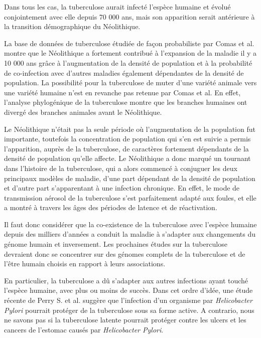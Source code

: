 \documentclass[twoside,a4paper,11pt,frenchb,openany]{report}
\begin{document}

Dans tous les cas, la tuberculose aurait infecté l'espèce humaine et évolué conjointement avec elle depuis 70 000 ans, mais son apparition serait antérieure à la transition démographique du Néolithique.

La base de données de tuberculose étudiée de façon probabiliste par Comas et al.\cite{comas} montre que le Néolithique a fortement contribué à l'expansion de la maladie il y a 10 000 ans grâce à l'augmentation de la densité de population et à la probabilité de co-infection avec d'autres maladies également dépendantes de la densité de population. La possibilité pour la tuberculose de muter d'une variété animale vers une variété humaine n'est en revanche pas retenue par Comas et al. En effet, l'analyse phylogénique de la tuberculose montre que les branches humaines ont divergé des branches animales avant le Néolithique.

Le Néolithique n'était pas la seule période où l'augmentation de la population fut importante, toutefois la concentration de population qui s'en est suivie a permis l'apparition, auprès de la tuberculose, de caractères fortement dépendants de la densité de population qu'elle affecte. Le Néolithique a donc marqué un tournant dans l'histoire de la tuberculose, qui a alors commencé à conjuguer les deux principaux modèles de maladie, d'une part dépendant de la densité de population et d'autre part s'apparentant à une infection chronique. En effet, le mode de transmission aérosol de la tuberculose s'est parfaitement adapté aux foules, et elle a montré à travers les âges des périodes de latence et de réactivation.


Il faut donc considérer que la co-existence de la tuberculose avec l'espèce humaine depuis des milliers d'années a conduit la maladie à s'adapter aux changements du génome humain et inversement. Les prochaines études sur la tuberculose devraient donc se concentrer sur des génomes complets de la tuberculose et de l'être humain choisis en rapport à leurs associations.

En particulier, la tuberculose a dû s'adapter aux autres infections ayant touché l'espèce humaine, avec plus ou moins de succès. Dans cet ordre d'idée, une étude récente de Perry S. et al.\cite{perry1, perry2} suggère que l'infection d'un organisme par \textit{Helicobacter Pylori} pourrait protéger de la tuberculose sous sa forme active. A contrario, nous ne savons pas si la tuberculose latente pourrait protéger contre les ulcers et les cancers de l'estomac causés par \textit{Helicobacter Pylori}.
\end{document}

